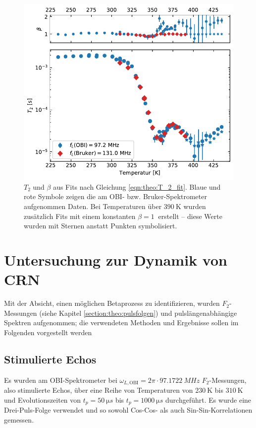\begin{figure}
	\begin{center}
		\includegraphics[width=.9\textwidth]{graphics/plot/t2.pdf}
	\end{center}
	\caption{$T_2$ und $\beta$ aus Fits nach Gleichung \eqref{eqn:theo:T_2_fit}. Blaue und rote Symbole zeigen die am OBI- bzw. Bruker-Spektrometer aufgenommen Daten. Bei Temperaturen über $\SI{390}{\kelvin}$ wurden zusätzlich Fits mit einem konstanten $\beta = \SI{1}{}$ erstellt -- diese Werte wurden mit Sternen anstatt Punkten symbolisiert.} \label{fig:res:T_2}
\end{figure}



\section{Untersuchung zur Dynamik von CRN} \label{section:res:F_2}

Mit der Absicht, einen möglichen Betaprozess zu identifizieren, wurden $F_2$-Messungen (siehe Kapitel \ref{section:theo:pulsfolgen}) und pulslängenabhängige Spektren aufgenommen; die verwendeten Methoden und Ergebnisse sollen im Folgenden vorgestellt werden

\subsection{Stimulierte Echos} \label{section:res:stimechos}

Es wurden am OBI-Spektrometer bei $\omega_{L, \text{OBI}} = 2\pi \cdot \SI{97.1722}{MHz}$ $F_2$-Messungen, also stimulierte Echos, über eine Reihe von Temperaturen von $\SI{230}{\kelvin}$ bis $\SI{310}{\kelvin}$ und Evolutionszeiten von $t_p = \SI{50}{\micro s}$ bis $t_p = \SI{1000}{\micro s}$ durchgeführt. Es wurde eine Drei-Puls-Folge verwendet und so sowohl Cos-Cos- als auch Sin-Sin-Korrelationen gemessen.

